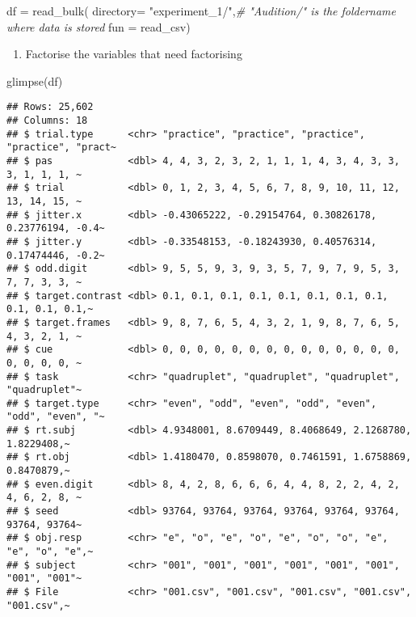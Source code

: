 \documentclass[
]{article}
\newenvironment{Shaded}{\begin{snugshade}}{\end{snugshade}}
\newcommand{\AttributeTok}[1]{\textcolor[rgb]{0.77,0.63,0.00}{#1}}
\newcommand{\CommentTok}[1]{\textcolor[rgb]{0.56,0.35,0.01}{\textit{#1}}}
\newcommand{\FunctionTok}[1]{\textcolor[rgb]{0.00,0.00,0.00}{#1}}
\newcommand{\NormalTok}[1]{#1}
\newcommand{\OtherTok}[1]{\textcolor[rgb]{0.56,0.35,0.01}{#1}}
\newcommand{\StringTok}[1]{\textcolor[rgb]{0.31,0.60,0.02}{#1}}
\providecommand{\tightlist}{%
  \setlength{\itemsep}{0pt}\setlength{\parskip}{0pt}}
\begin{document}
\begin{Shaded}
\begin{Highlighting}[]
\NormalTok{df }\OtherTok{=} \FunctionTok{read\_bulk}\NormalTok{(}
  \AttributeTok{directory=} \StringTok{"experiment\_1/"}\NormalTok{,}\CommentTok{\# "Audition/" is the foldername where data is stored}
  \AttributeTok{fun =}\NormalTok{ read\_csv)}
\end{Highlighting}
\end{Shaded}

\begin{enumerate}
\def\labelenumi{\roman{enumi}.}
\tightlist
\item
  Factorise the variables that need factorising
\end{enumerate}

\begin{Shaded}
\begin{Highlighting}[]
\FunctionTok{glimpse}\NormalTok{(df)}
\end{Highlighting}
\end{Shaded}

\begin{verbatim}
## Rows: 25,602
## Columns: 18
## $ trial.type      <chr> "practice", "practice", "practice", "practice", "pract~
## $ pas             <dbl> 4, 4, 3, 2, 3, 2, 1, 1, 1, 4, 3, 4, 3, 3, 3, 1, 1, 1, ~
## $ trial           <dbl> 0, 1, 2, 3, 4, 5, 6, 7, 8, 9, 10, 11, 12, 13, 14, 15, ~
## $ jitter.x        <dbl> -0.43065222, -0.29154764, 0.30826178, 0.23776194, -0.4~
## $ jitter.y        <dbl> -0.33548153, -0.18243930, 0.40576314, 0.17474446, -0.2~
## $ odd.digit       <dbl> 9, 5, 5, 9, 3, 9, 3, 5, 7, 9, 7, 9, 5, 3, 7, 7, 3, 3, ~
## $ target.contrast <dbl> 0.1, 0.1, 0.1, 0.1, 0.1, 0.1, 0.1, 0.1, 0.1, 0.1, 0.1,~
## $ target.frames   <dbl> 9, 8, 7, 6, 5, 4, 3, 2, 1, 9, 8, 7, 6, 5, 4, 3, 2, 1, ~
## $ cue             <dbl> 0, 0, 0, 0, 0, 0, 0, 0, 0, 0, 0, 0, 0, 0, 0, 0, 0, 0, ~
## $ task            <chr> "quadruplet", "quadruplet", "quadruplet", "quadruplet"~
## $ target.type     <chr> "even", "odd", "even", "odd", "even", "odd", "even", "~
## $ rt.subj         <dbl> 4.9348001, 8.6709449, 8.4068649, 2.1268780, 1.8229408,~
## $ rt.obj          <dbl> 1.4180470, 0.8598070, 0.7461591, 1.6758869, 0.8470879,~
## $ even.digit      <dbl> 8, 4, 2, 8, 6, 6, 6, 4, 4, 8, 2, 2, 4, 2, 4, 6, 2, 8, ~
## $ seed            <dbl> 93764, 93764, 93764, 93764, 93764, 93764, 93764, 93764~
## $ obj.resp        <chr> "e", "o", "e", "o", "e", "o", "o", "e", "e", "o", "e",~
## $ subject         <chr> "001", "001", "001", "001", "001", "001", "001", "001"~
## $ File            <chr> "001.csv", "001.csv", "001.csv", "001.csv", "001.csv",~
\end{verbatim}
\end{document}
